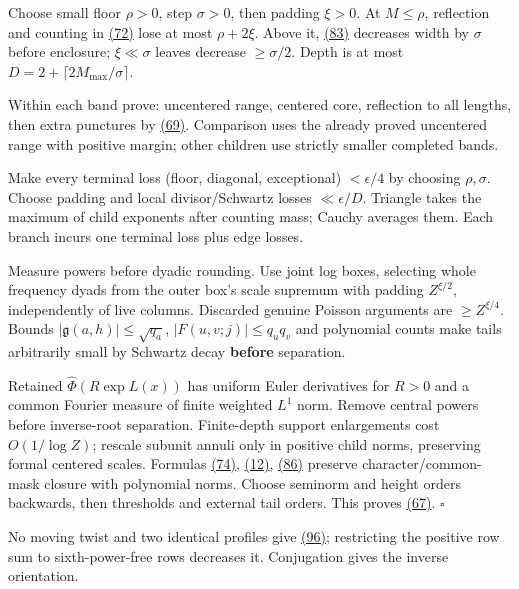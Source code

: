 Choose small floor \(\rho>0\), step \(\sigma>0\), then padding \(\xi>0\). At \(M\le\rho\), reflection and counting in \protect\hyperlink{cf:eq:D.8}{(72)} lose at most \(\rho+2\xi\). Above it, \protect\hyperlink{cf:eq:D.19}{(83)} decreases width by \(\sigma\) before enclosure; \(\xi\ll\sigma\) leaves decrease \(\ge\sigma/2\). Depth is at most \(D=2+\lceil2M_{\max}/\sigma\rceil\).

Within each band prove: uncentered range, centered core, reflection to all lengths, then extra punctures by \protect\hyperlink{cf:eq:D.5}{(69)}. Comparison uses the already proved uncentered range with positive margin; other children use strictly smaller completed bands.

Make every terminal loss (floor, diagonal, exceptional) \(<\epsilon/4\) by choosing \(\rho,\sigma\). Choose padding and local divisor/Schwartz losses \(\ll\epsilon/D\). Triangle takes the maximum of child exponents after counting mass; Cauchy averages them. Each branch incurs one terminal loss plus edge losses.

Measure powers before dyadic rounding. Use joint log boxes, selecting whole frequency dyads from the outer box's scale supremum with padding \(Z^{\xi/2}\), independently of live columns. Discarded genuine Poisson arguments are \(\ge Z^{\xi/4}\). Bounds \(|\mathfrak g(a,h)|\le\sqrt{q_a}\), \(|F(u,v;j)|\le q_uq_v\) and polynomial counts make tails arbitrarily small by Schwartz decay \textbf{before} separation.

Retained \(\widehat\Phi(R\exp L(x))\) has uniform Euler derivatives for \(R>0\) and a common Fourier measure of finite weighted \(L^1\) norm. Remove central powers before inverse-root separation. Finite-depth support enlargements cost \(O(1/\log Z)\); rescale subunit annuli only in positive child norms, preserving formal centered scales. Formulas \protect\hyperlink{cf:eq:D.10}{(74)}, \protect\hyperlink{cf:eq:A.16}{(12)}, \protect\hyperlink{cf:eq:D.22}{(86)} preserve character/common-mask closure with polynomial norms. Choose seminorm and height orders backwards, then thresholds and external tail orders. This proves \protect\hyperlink{cf:eq:D.3}{(67)}. \(\square\)

No moving twist and two identical profiles give \protect\hyperlink{cf:eq:3.3}{(96)}; restricting the positive row sum to sixth-power-free rows decreases it. Conjugation gives the inverse orientation.

\hypertarget{cf:moment-corollaries}{}

\label{cf:moment-corollaries}

